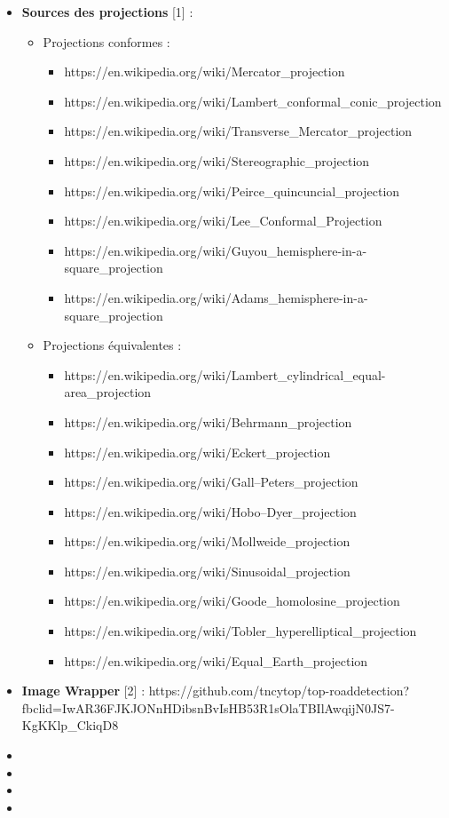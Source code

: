 \documentclass{article}
\begin{document}
\begin{itemize}
    \item \textbf{Sources des projections} [1] :
    \begin{itemize}
        \item Projections conformes :
        \begin{itemize}
            \item https://en.wikipedia.org/wiki/Mercator\_projection
            \item https://en.wikipedia.org/wiki/Lambert\_conformal\_conic\_projection
            \item https://en.wikipedia.org/wiki/Transverse\_Mercator\_projection
            \item https://en.wikipedia.org/wiki/Stereographic\_projection
            \item https://en.wikipedia.org/wiki/Peirce\_quincuncial\_projection
            \item https://en.wikipedia.org/wiki/Lee\_Conformal\_Projection
            \item https://en.wikipedia.org/wiki/Guyou\_hemisphere-in-a-square\_projection
            \item https://en.wikipedia.org/wiki/Adams\_hemisphere-in-a-square\_projection
        \end{itemize}
        \vspace{2\baselineskip}
        \item Projections équivalentes :
        \begin{itemize}
            \item https://en.wikipedia.org/wiki/Lambert\_cylindrical\_equal-area\_projection
            \item https://en.wikipedia.org/wiki/Behrmann\_projection
            \item https://en.wikipedia.org/wiki/Eckert\_projection
            \item https://en.wikipedia.org/wiki/Gall–Peters\_projection
            \item https://en.wikipedia.org/wiki/Hobo–Dyer\_projection
            \item https://en.wikipedia.org/wiki/Mollweide\_projection
            \item https://en.wikipedia.org/wiki/Sinusoidal\_projection
            \item https://en.wikipedia.org/wiki/Goode\_homolosine\_projection
            \item https://en.wikipedia.org/wiki/Tobler\_hyperelliptical\_projection
            \item https://en.wikipedia.org/wiki/Equal\_Earth\_projection
        \end{itemize}
    \end{itemize}
    \item \textbf{Image Wrapper} [2] : https://github.com/tncytop/top-roaddetection?fbclid=IwAR36FJKJONnHDibsnBvIsHB53R1sOlaTBIlAwqijN0JS7-KgKKlp\_CkiqD8
    \item 
    \item 
    \item 
    \item 
\end{itemize}
\end{document}

